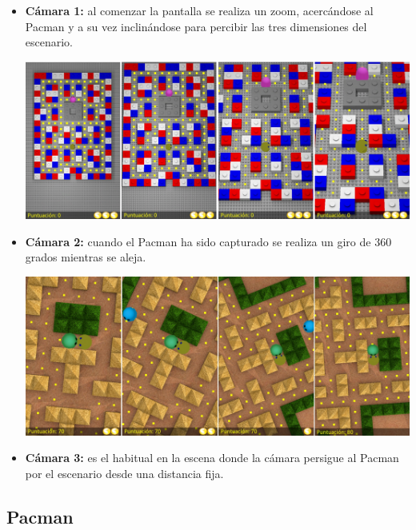 \begin{itemize}
\item \textbf{Cámara 1:} al comenzar la pantalla se realiza un zoom, acercándose al Pacman y a su vez inclinándose para percibir las tres dimensiones del escenario.

   \begin{minipage}{\linewidth}
         \centering
         \includegraphics[width=13.5cm]{img/camaraZoom.jpg}	
    \end{minipage}

\item \textbf{Cámara 2:} cuando el Pacman ha sido capturado se realiza un giro de 360 grados mientras se aleja.

   \begin{minipage}{\linewidth}
         \centering
         \includegraphics[width=13.5cm]{img/camaraRotate.jpg}	
    \end{minipage}

\item \textbf{Cámara 3:} es el habitual en la escena donde la cámara persigue al Pacman por el escenario desde una distancia fija.

\end{itemize}

\subsection{Pacman}

